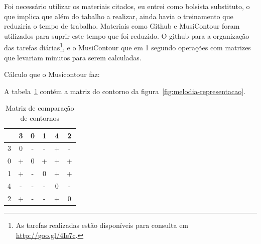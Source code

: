 \documentclass[11pt]{article}
\begin{document}
\label{sec:discussao}



Foi necessário utilizar os materiais citados, eu entrei como bolsista
substituto, o que implica que além do tabalho a realizar, ainda havia
o treinamento que reduziria o tempo de trabalho. Materiais como Github
e MusiContour foram utilizados para suprir este tempo que foi
reduzido. O github para a organização das tarefas diárias\footnote{As
  tarefas realizadas estão disponíveis para consulta em
  \url{http://goo.gl/4Ie7c}.}, e o MusiContour que em 1 segundo
operações com matrizes que levariam minutos para serem calculadas.

Cálculo que o Musicontour faz:

A tabela~\ref{tab:matriz-comparacao-contornos} contém a matriz do
contorno da figura~\ref{fig:melodia-representacao}.

\begin{table}
  \centering
  \begin{tabular}{c|ccccc}
    &3&0&1&4&2\\
    \hline
    3&0&-&-&+&-\\
    0&+&0&+&+&+\\
    1&+&-&0&+&+\\
    4&-&-&-&0&-\\
    2&+&-&-&+&0\\
  \end{tabular}
  \caption{Matriz de comparação de contornos}
  \label{tab:matriz-comparacao-contornos}
\end{table}
\end{document}
